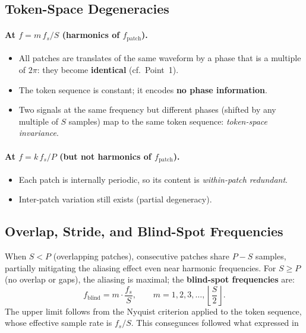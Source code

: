 \subsection{Token-Space Degeneracies}

\paragraph{At $f = m\,f_s/S$ (harmonics of $f_{\mathrm{patch}}$).}
\begin{itemize}
    \item All patches are translates of the same waveform by a phase that is a multiple of
          $2\pi$: they become \textbf{identical} (cf.\ Point~1).
    \item The token sequence is constant; it encodes \textbf{no phase information}.
    \item Two signals at the same frequency but different phases (shifted by any multiple of
          $S$ samples) map to the same token sequence: \emph{token-space invariance}.
\end{itemize}

\paragraph{At $f = k\,f_s/P$ (but not harmonics of $f_{\mathrm{patch}}$).}
\begin{itemize}
    \item Each patch is internally periodic, so its content is \emph{within-patch redundant}.
    \item Inter-patch variation still exists (partial degeneracy).
\end{itemize}

\subsection{Overlap, Stride, and Blind-Spot Frequencies}

When $S < P$ (overlapping patches), consecutive patches share $P - S$ samples, partially
mitigating the aliasing effect even near harmonic frequencies.  For $S \geq P$ (no overlap
or gaps), the aliasing is maximal; the \textbf{blind-spot frequencies} are:
\begin{equation}
    \boxed{f_{\mathrm{blind}} = m \cdot \frac{f_s}{S},
    \qquad m = 1, 2, 3, \ldots, \left\lfloor \frac{S}{2} \right\rfloor.}
\end{equation}
The upper limit follows from the Nyquist criterion applied to the token sequence, whose
effective sample rate is $f_s/S$. This consegunces followed what expressed in \cite{paganiPreliminaryInsightsChronos2026b}

